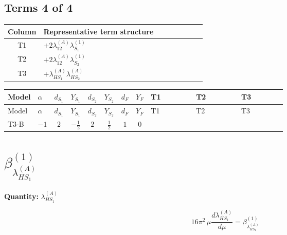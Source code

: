 \documentclass[8pt]{article}
\begin{document}
\begin{landscape}
\subsection*{Terms 4 of 4}
\begin{center}
\begin{tabular}{@{}c >{\raggedright\arraybackslash}p{0.82\linewidth}@{}}
\toprule
Column & Representative term structure \\
\midrule
T1 & \(\displaystyle +2 {\lambda_{12}^{(A)}} {\lambda_{S_1}^{(1)}}\) \\
\midrule
T2 & \(\displaystyle +2 {\lambda_{12}^{(A)}} {\lambda_{S_2}^{(1)}}\) \\
\midrule
T3 & \(\displaystyle +{\lambda_{HS_1}^{(A)}} {\lambda_{HS_2}^{(A)}}\) \\
\midrule
\bottomrule
\end{tabular}
\end{center}
\smallskip
\tiny
\begin{longtable}{@{}llcccccc >{\raggedright\arraybackslash}p{0.21\linewidth} >{\raggedright\arraybackslash}p{0.21\linewidth} >{\raggedright\arraybackslash}p{0.21\linewidth}@{}}
\toprule
Model & $\alpha$ & $d_{S_1}$ & $Y_{S_1}$ & $d_{S_2}$ & $Y_{S_2}$ & $d_F$ & $Y_F$ & T1 & T2 & T3 \\
\midrule
\endfirsthead
\toprule
Model & $\alpha$ & $d_{S_1}$ & $Y_{S_1}$ & $d_{S_2}$ & $Y_{S_2}$ & $d_F$ & $Y_F$ & T1 & T2 & T3 \\
\midrule
\endhead
T3-B & $-1$ & $2$ & $-\frac{1}{2}$ & $2$ & $\frac{1}{2}$ & $1$ & $0$ & \scriptsize\adjustbox{max width=\linewidth}{$\begin{gathered} +2 {\lambda_{12}^{(A)}} {\lambda_{S_1}^{(1)}}\end{gathered}$} & \scriptsize\adjustbox{max width=\linewidth}{$\begin{gathered} +2 {\lambda_{12}^{(A)}} {\lambda_{S_2}^{(1)}}\end{gathered}$} & \scriptsize\adjustbox{max width=\linewidth}{$\begin{gathered} +{\lambda_{HS_1}^{(A)}} {\lambda_{HS_2}^{(A)}}\end{gathered}$} \\
\midrule
\bottomrule
\end{longtable}
\clearpage
\section*{$\beta_{\lambda_{HS_1}^{(A)}}^{(1)}$}
\noindent\textbf{Quantity: }$\lambda_{HS_1}^{(A)}$\par\smallskip
\[16\pi^2\,\mu\frac{d \lambda_{HS_1}^{(A)}}{d\mu}=\beta_{\lambda_{HS_1}^{(A)}}^{(1)}\]

\end{landscape}
\end{document}
